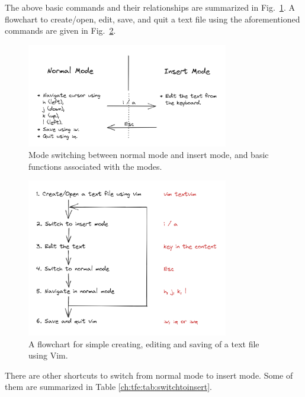 The above basic commands and their relationships are summarized in Fig.~\ref{ch:tfe:fig:vimbasicmodeswitching}. A flowchart to create/open, edit, save, and quit a text file using the aforementioned commands are given in Fig.~\ref{ch:tfe:fig:vimbasicoperationflowchart}.

\begin{figure}[!htb]
\centering
\includegraphics[width=250pt]{chapters/part-1/figures/vimbasicmodeswitching.png}
\caption{Mode switching between normal mode and insert mode, and basic functions associated with the modes.} \label{ch:tfe:fig:vimbasicmodeswitching}
\end{figure}

\begin{figure}[!htb]
\centering
\includegraphics[width=250pt]{chapters/part-1/figures/vimbasicoperationflowchart.png}
\caption{A flowchart for simple creating, editing and saving of a text file using Vim.} \label{ch:tfe:fig:vimbasicoperationflowchart}
\end{figure}

There are other shortcuts to switch from normal mode to insert mode. Some of them are summarized in Table \ref{ch:tfe:tab:switchtoinsert}.

